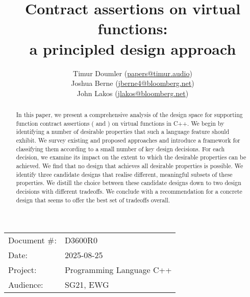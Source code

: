 \newcommand{\propref}[1]{\hyperref[#1]{\tcode{#1}}}



\title{Contract assertions on virtual functions: \\ a principled design approach}
\author{
Timur Doumler \small(\href{mailto:papers@timur.audio}{papers@timur.audio}) \\
Joshua Berne \small(\href{mailto:jberne4@bloomberg.net}{jberne4@bloomberg.net}) \\
John Lakos \small(\href{mailto:jlakos@bloomberg.net}{jlakos@bloomberg.net}) 
}
\date{}
\maketitle

\begin{tabular}{ll}
Document \#: & D3600R0 \\
Date: &2025-08-25 \\
Project: & Programming Language C++ \\
Audience: & SG21, EWG
\end{tabular}

\begin{abstract}
In this paper, we present a comprehensive analysis of the design space for supporting function contract assertions ( and ) on virtual functions in C++. We begin by identifying a number of desirable properties that such a language feature should exhibit. We survey existing and proposed approaches and introduce a framework for classifying them according to a small number of key design decisions. For each decision, we examine its impact on the extent to which the desirable properties can be achieved. We find that no design that achieves all desirable properties is possible. We identify three candidate designs that realise different, meaningful subsets of these properties. We distill the choice between these candidate designs down to two design decisions with different tradeoffs. We conclude with a recommendation for a concrete design that seems to offer the best set of tradeoffs overall.
\end{abstract}


\pagebreak
\tableofcontents*
\pagebreak


